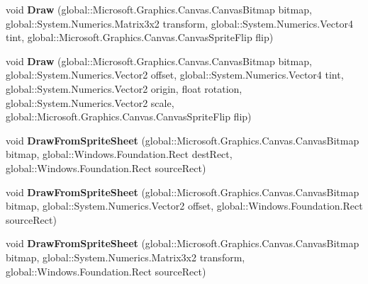 \begin{DoxyCompactItemize}
void {\bfseries Draw} (global\+::\+Microsoft.\+Graphics.\+Canvas.\+Canvas\+Bitmap bitmap, global\+::\+System.\+Numerics.\+Matrix3x2 transform, global\+::\+System.\+Numerics.\+Vector4 tint, global\+::\+Microsoft.\+Graphics.\+Canvas.\+Canvas\+Sprite\+Flip flip)
\item 
\mbox{\label{class_microsoft_1_1_graphics_1_1_canvas_1_1_canvas_sprite_batch_ad594e0d83883455fdc71585e3b4b4b46}} 
void {\bfseries Draw} (global\+::\+Microsoft.\+Graphics.\+Canvas.\+Canvas\+Bitmap bitmap, global\+::\+System.\+Numerics.\+Vector2 offset, global\+::\+System.\+Numerics.\+Vector4 tint, global\+::\+System.\+Numerics.\+Vector2 origin, float rotation, global\+::\+System.\+Numerics.\+Vector2 scale, global\+::\+Microsoft.\+Graphics.\+Canvas.\+Canvas\+Sprite\+Flip flip)
\item 
\mbox{\label{class_microsoft_1_1_graphics_1_1_canvas_1_1_canvas_sprite_batch_aad806d7034e245c959c707dc4391e844}} 
void {\bfseries Draw\+From\+Sprite\+Sheet} (global\+::\+Microsoft.\+Graphics.\+Canvas.\+Canvas\+Bitmap bitmap, global\+::\+Windows.\+Foundation.\+Rect dest\+Rect, global\+::\+Windows.\+Foundation.\+Rect source\+Rect)
\item 
\mbox{\label{class_microsoft_1_1_graphics_1_1_canvas_1_1_canvas_sprite_batch_a92f0f8a12c6342a95d48002a8fd3b11c}} 
void {\bfseries Draw\+From\+Sprite\+Sheet} (global\+::\+Microsoft.\+Graphics.\+Canvas.\+Canvas\+Bitmap bitmap, global\+::\+System.\+Numerics.\+Vector2 offset, global\+::\+Windows.\+Foundation.\+Rect source\+Rect)
\item 
\mbox{\label{class_microsoft_1_1_graphics_1_1_canvas_1_1_canvas_sprite_batch_a0d74b7bfe143a9832126256d47c187e6}} 
void {\bfseries Draw\+From\+Sprite\+Sheet} (global\+::\+Microsoft.\+Graphics.\+Canvas.\+Canvas\+Bitmap bitmap, global\+::\+System.\+Numerics.\+Matrix3x2 transform, global\+::\+Windows.\+Foundation.\+Rect source\+Rect)
\item 
\mbox{\label{class_microsoft_1_1_graphics_1_1_canvas_1_1_canvas_sprite_batch_ad98b847473221fdac7fbd14a5b9be240}} 

\end{DoxyCompactItemize}
